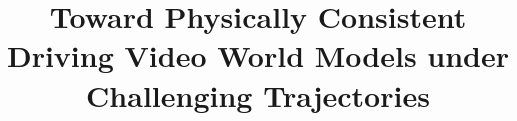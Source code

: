 \documentclass[runningheads]{llncs}
\begin{document}


\title{Toward Physically Consistent Driving Video World Models under Challenging Trajectories}






\renewcommand{\thefootnote}{\fnsymbol{footnote}}

\end{document}

